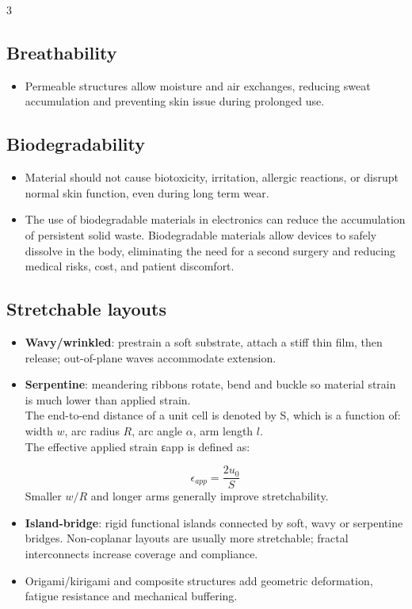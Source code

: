 \documentclass[10pt,a4paper]{ctexart}
\newcommand{\key}[1]{\textbf{#1}}
\newcommand{\formula}[1]{%
  \par\vspace{1pt}\begingroup
  \setlength{\abovedisplayskip}{0pt}\setlength{\belowdisplayskip}{0pt}
  \[#1\]\endgroup\vspace{1pt}}
\begin{document}
\begin{multicols*}{3}
\subsection{Breathability}
\begin{itemize}
  \item Permeable structures allow moisture and air exchanges, 
  reducing sweat accumulation and preventing skin issue during prolonged use.
\end{itemize}

\subsection{Biodegradability}
\begin{itemize}
  \item Material should not cause biotoxicity, irritation, allergic reactions, 
  or disrupt normal skin function, even during long term wear.
  \item The use of biodegradable materials in electronics can reduce the 
  accumulation of persistent solid waste. Biodegradable materials allow devices 
  to safely dissolve in the body, eliminating the need for a second surgery and 
  reducing medical risks, cost, and patient discomfort.
\end{itemize}

\subsection{Stretchable layouts}
\begin{itemize}
  \item \key{Wavy/wrinkled}: prestrain a soft substrate, attach a stiff thin
  film, then release; out-of-plane waves accommodate extension.
  \item \key{Serpentine}: meandering ribbons rotate, bend and buckle so
  material strain is much lower than applied strain. \\
  The end-to-end distance of a unit cell is denoted by S, which is a function of:
  width $w$, arc radius $R$, arc angle $\alpha$, arm length $l$. \\
  The effective applied strain εapp is defined as:\\
  \formula{\displaystyle \epsilon_{app} = \frac{2 u_0}{S}}
  Smaller $w/R$ and longer arms generally improve stretchability.
  \item \key{Island-bridge}: rigid functional islands connected by soft,
  wavy or serpentine bridges. Non-coplanar layouts are usually more
  stretchable; fractal interconnects increase coverage and compliance.
  \item Origami/kirigami and composite structures add geometric
  deformation, fatigue resistance and mechanical buffering.
\end{itemize}


\end{multicols*}
\end{document}
